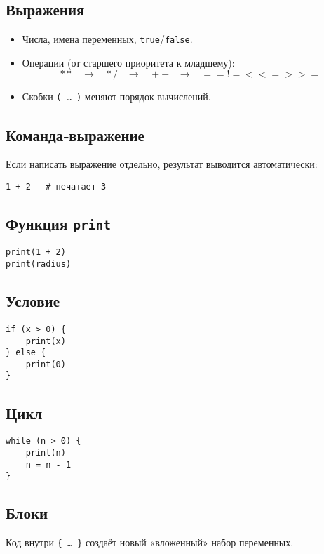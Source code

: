 \documentclass[12pt]{article}
\begin{document}
\subsection{Выражения}
\begin{itemize}
	\item Числа, имена переменных, \texttt{true}/\texttt{false}.
	\item Операции (от старшего приоритета к младшему):
	      \[ ** \;\;\; \rightarrow \;\;\; * / \;\;\; \rightarrow \;\;\; + - \;\;\; \rightarrow \;\;\; == != < <= > >= \]
	\item Скобки \texttt{( … )} меняют порядок вычислений.
\end{itemize}

\subsection{Команда‑выражение}
Если написать выражение отдельно, результат выводится автоматически:
\begin{verbatim}
1 + 2   # печатает 3
\end{verbatim}

\subsection{Функция \texttt{print}}
\begin{verbatim}
print(1 + 2)
print(radius)
\end{verbatim}

\subsection{Условие}
\begin{verbatim}
if (x > 0) {
    print(x)
} else {
    print(0)
}
\end{verbatim}

\subsection{Цикл}
\begin{verbatim}
while (n > 0) {
    print(n)
    n = n - 1
}
\end{verbatim}

\subsection{Блоки}
Код внутри \texttt{\{ … \}} создаёт новый «вложенный» набор переменных.
\end{document}
